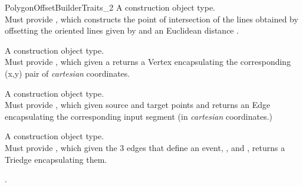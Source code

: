 \begin{ccRefConcept}{PolygonOffsetBuilderTraits_2}
{A construction object type.\\
Must provide , which constructs the point of intersection of the lines obtained by offsetting the oriented lines given by  and  an Euclidean distance .
}

{A construction object type.\\
Must provide , which given a   returns a Vertex encapsulating the corresponding (x,y) pair of \textit{cartesian} coordinates.}

{A construction object type.\\
Must provide , which given source and target points  and  returns an Edge encapsulating the corresponding input segment (in \textit{cartesian} coordinates.)}

{A construction object type.\\
Must provide , which given the 3 edges that define an event, ,  and , returns a Triedge encapsulating them.}

\ccHasModels

.

\ccSeeAlso

\\
\\

\end{ccRefConcept}

